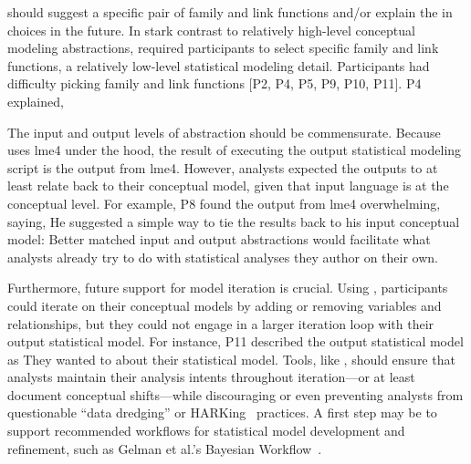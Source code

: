 \rTisane should suggest a specific pair of family and link functions
and/or explain the  in choices in the future. 
In stark contrast to \rTisanes relatively high-level conceptual modeling
abstractions, \rTisane required participants to select specific family and link
functions, a relatively low-level statistical modeling detail. Participants had
difficulty picking family and link functions [P2, P4, P5, P9, P10, P11]. P4
explained, 


The input and output levels of abstraction should be commensurate. Because
\rTisane uses lme4 under the hood, the result of executing the output
statistical modeling script is the output from lme4. However, analysts expected
the outputs to at least relate back to their conceptual model, given that
\rTisanes input language is at the conceptual level. For example, P8 found the
output from lme4 overwhelming, saying,  He suggested a simple way to
tie the results back to his input conceptual model: 
Better matched input and output abstractions would facilitate what analysts
already try to do with statistical analyses they author on their own.

Furthermore, future support for model iteration is crucial. Using \rTisane,
participants could iterate on their conceptual models by adding or removing
variables and relationships, but they could not engage in a larger iteration
loop with their output statistical model. 
For instance, P11 described the \rTisane output statistical model as
 They wanted to  about
their statistical model. Tools, like \rTisane, should ensure that analysts
maintain their analysis intents throughout iteration---or at least document
conceptual shifts---while discouraging or even preventing analysts from
questionable ``data dredging'' or HARKing~\cite{kerr1998harking} practices. A
first step may be to support recommended workflows for statistical model
development and refinement, such as Gelman et al.'s Bayesian
Workflow~\cite{gelman2020modelExpansion}.

